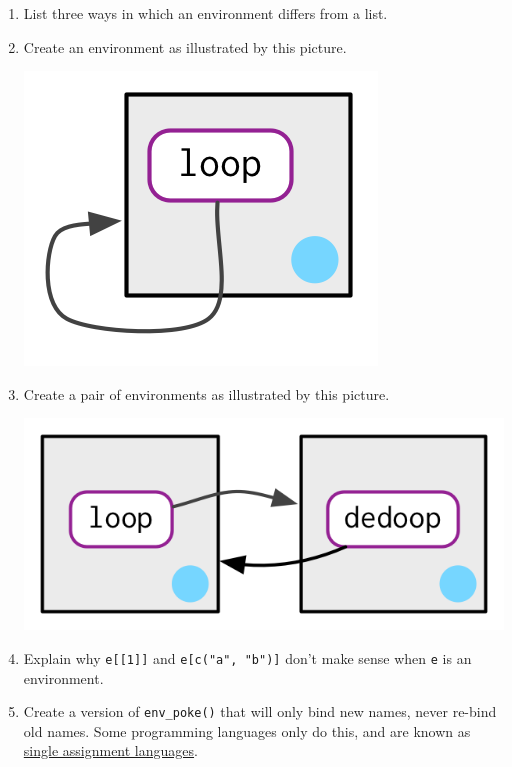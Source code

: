 \documentclass[]{book}
\theoremstyle{definition}
\theoremstyle{definition}
\theoremstyle{definition}
\theoremstyle{remark}
\begin{document}
\begin{enumerate}
\def\labelenumi{\arabic{enumi}.}
\item
  List three ways in which an environment differs from a list.
\item
  Create an environment as illustrated by this picture.

  \begin{center}\includegraphics{diagrams/environments/recursive-1} \end{center}
\item
  Create a pair of environments as illustrated by this picture.

  \begin{center}\includegraphics{diagrams/environments/recursive-2} \end{center}
\item
  Explain why \texttt{e{[}{[}1{]}{]}} and \texttt{e{[}c("a",\ "b"){]}}
  don't make sense when \texttt{e} is an environment.
\item
  Create a version of \texttt{env\_poke()} that will only bind new
  names, never re-bind old names. Some programming languages only do
  this, and are known as
  \href{http://en.wikipedia.org/wiki/Assignment_(computer_science)\#Single_assignment}{single
  assignment languages}.
\end{enumerate}
\end{document}

